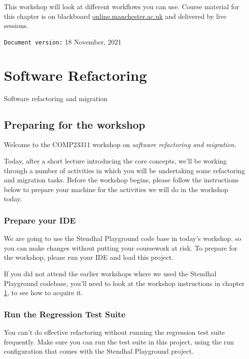 \documentclass[
]{book}
\begin{document}
This workshop will look at different workflows you can use. Course material for this chapter is on blackboard \href{https://online.manchester.ac.uk}{online.manchester.ac.uk} and delivered by live sessions.

\texttt{Document\ version:} 18 November, 2021

\hypertarget{refactoring}{%
\chapter{Software Refactoring}\label{refactoring}}

Software refactoring and migration

\hypertarget{gitprep}{%
\section{Preparing for the workshop}\label{gitprep}}

Welcome to the COMP23311 workshop on \emph{software refactoring and migration}.

Today, after a short lecture introducing the core concepts, we'll be working through a number of activities in which you will be undertaking some refactoring and migration tasks. Before the workshop begins, please follow the instructions below to prepare your machine for the activities we will do in the workshop today.

\hypertarget{prepide}{%
\subsection{Prepare your IDE}\label{prepide}}

We are going to use the Stendhal Playground code base in today's workshop. so you can make changes without putting your coursework at risk. To prepare for the workshop, please run your IDE and load this project.

If you did not attend the earlier workshops where we used the Stendhal Playground codebase, you'll need to look at the workshop instructions in chapter \ref{refactoring}, to see how to acquire it.

\hypertarget{testsuite}{%
\subsection{Run the Regression Test Suite}\label{testsuite}}

You can't do effective refactoring without running the regression test suite frequently. Make sure you can run the test suite in this project, using the run configuration that comes with the Stendhal Playground project.
\end{document}
